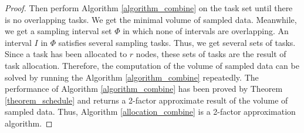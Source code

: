 \documentclass[prodmode,acmtosn]{acmsmall}
\begin{document}
\begin{proof}
Then perform Algorithm \ref{algorithm_combine} on the task set until there is no overlapping tasks.  We get the minimal volume of sampled data. Meanwhile, we get a sampling interval set $\Phi$ in which none of intervals are overlapping. An interval $I$ in $\Phi$ satisfies several sampling tasks. Thus, we get several sets of tasks. Since a task has been allocated to $r$ nodes, these sets of tasks are the result of task allocation. Therefore, the computation of the volume of sampled data can be solved by running the Algorithm \ref{algorithm_combine} repeatedly. The performance of Algorithm \ref{algorithm_combine} has been proved by Theorem \ref{theorem_schedule} and returns a 2-factor approximate result of the volume of sampled data. Thus, Algorithm \ref{allocation_combine} is a 2-factor approximation algorithm.
%
%
\end{proof}
\end{document}
